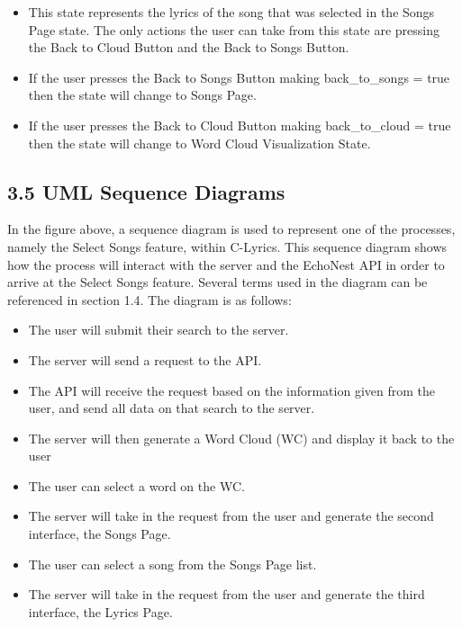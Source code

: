 \documentclass[]{article}
\begin{document}
\begin{itemize}
  \begin{itemize}
  \itemsep1pt\parskip0pt
  \item
    This state represents the lyrics of the song that was selected in
    the Songs Page state. The only actions the user can take from this
    state are pressing the Back to Cloud Button and the Back to Songs
    Button.
  \item
    If the user presses the Back to Songs Button making back\_to\_songs
    = true then the state will change to Songs Page.
  \item
    If the user presses the Back to Cloud Button making back\_to\_cloud
    = true then the state will change to Word Cloud Visualization State.
  \end{itemize}
\end{itemize}

\subsection{3.5 UML Sequence Diagrams}\label{uml-sequence-diagrams}

In the figure above, a sequence diagram is used to represent one of the
processes, namely the Select Songs feature, within C-Lyrics. This
sequence diagram shows how the process will interact with the server and
the EchoNest API in order to arrive at the Select Songs feature. Several
terms used in the diagram can be referenced in section 1.4. The diagram
is as follows:

\begin{itemize}
\itemsep1pt\parskip0pt
\item
  The user will submit their search to the server.
\item
  The server will send a request to the API.
\item
  The API will receive the request based on the information given from
  the user, and send all data on that search to the server.
\item
  The server will then generate a Word Cloud (WC) and display it back to
  the user
\item
  The user can select a word on the WC.
\item
  The server will take in the request from the user and generate the
  second interface, the Songs Page.
\item
  The user can select a song from the Songs Page list.
\item
  The server will take in the request from the user and generate the
  third interface, the Lyrics Page.
\end{itemize}
\end{document}
